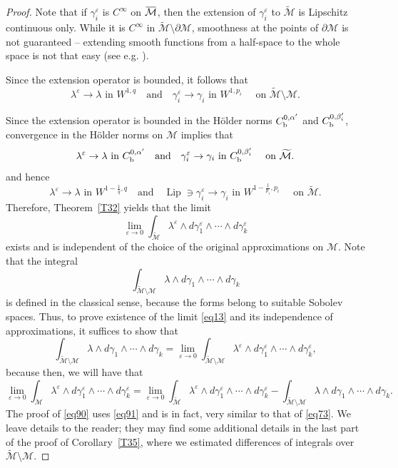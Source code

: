 \documentclass[intlimits,12pt,reqno]{amsart}
\newcommand{\cM}{\mathcal M}
\newcommand{\overbar}[1]{\mkern 1.7mu\overline{\mkern-1.7mu#1\mkern-1.5mu}\mkern 1.5mu}
\newcommand{\eps}{\varepsilon}
\numberwithin{equation}{section}
\def\lip{\operatorname{Lip}}
\theoremstyle{definition}
\begin{document}
\begin{proof}
Note that if $\gamma_i^\eps$ is $C^\infty$ on $\overbar{\cM}$, then the  extension of $\gamma_i^\eps$ to $\widetilde{\cM}$ is Lipschitz continuous only. While it is $C^\infty$ in $\widetilde{\cM}\setminus\partial\cM$, smoothness at the points of $\partial\cM$ is not guaranteed -- extending smooth functions from a half-space to the whole space is not that easy (see e.g. \cite{Seeley}).

Since the extension operator is bounded, it follows that
\begin{equation} 
\label{eq91}
\lambda^\eps\to\lambda
\text{ in } W^{1,q}
\quad
\text{and}
\quad
\gamma_i^\eps\to \gamma_i
\text{ in } W^{1,p_i}
\quad
\text{ on }
\widetilde{\cM}\setminus \cM.
\end{equation}

Since the extension operator is bounded in the H\"older norms $C_{\rm b}^{0,\alpha'}$ and $C_{\rm b}^{0,\beta_i'}$, convergence in the H\"older norms on $\cM$ implies that
$$
\lambda^\eps\to\lambda
\text{ in } C_{\rm b}^{0,\alpha'}
\quad
\text{and}
\quad
\gamma_i^\eps\to \gamma_i
\text{ in } C_{\rm b}^{0,\beta_i'}
\quad
\text{ on }
\widetilde{\cM}.
$$
and hence
$$
\lambda^\eps\to\lambda
\text{ in } W^{1-\frac{1}{q},q}
\quad
\text{and}
\quad
\lip\ni\gamma_i^\eps\to \gamma_i
\text{ in } W^{1-\frac{1}{p_i},p_i}
\quad
\text{ on }
\widetilde{\cM}.
$$
Therefore, Theorem~\ref{T32} yields that the limit
\begin{equation}
\label{eq89}
\lim_{\eps\to 0} 
\int_{\widetilde{\cM}}\lambda^\eps\wedge d\gamma^\eps_1\wedge\cdots\wedge d\gamma^\eps_k
\end{equation}
exists and is independent of the choice of the original approximations on $\cM$.
Note that the integral
$$
\int_{\widetilde{\cM}\setminus\cM}\lambda\wedge d\gamma_1\wedge\cdots\wedge d\gamma_k
$$
is defined in the classical sense, because the forms belong to suitable Sobolev spaces.
Thus, to prove existence of the limit \eqref{eq13} and its independence of approximations, it suffices to show that
\begin{equation}
\label{eq90}
\int_{\widetilde{\cM}\setminus\cM}\lambda\wedge d\gamma_1\wedge\cdots\wedge d\gamma_k=
\lim_{\eps\to 0}
\int_{\widetilde{\cM}\setminus\cM}\lambda^\eps\wedge d\gamma^\eps_1\wedge\cdots\wedge d\gamma^\eps_k,
\end{equation}
because then, we will have that
$$
\lim_{\eps\to 0}
\int_{\cM}\lambda^\eps\wedge d\gamma^\eps_1\wedge\cdots\wedge d\gamma^\eps_k=
\lim_{\eps\to 0} 
\int_{\widetilde{\cM}}\lambda^\eps\wedge d\gamma^\eps_1\wedge\cdots\wedge d\gamma^\eps_k-
\int_{\widetilde{\cM}\setminus\cM}\lambda\wedge d\gamma_1\wedge\cdots\wedge d\gamma_k.
$$
The proof of \eqref{eq90} uses \eqref{eq91} and is in fact, 
very similar to that of \eqref{eq73}. We leave details to the reader; they may find some additional details in the last part of the proof of Corollary~\ref{T35}, where we estimated differences of integrals over $\widetilde{\cM}\setminus\cM$.
\end{proof}
\end{document}
